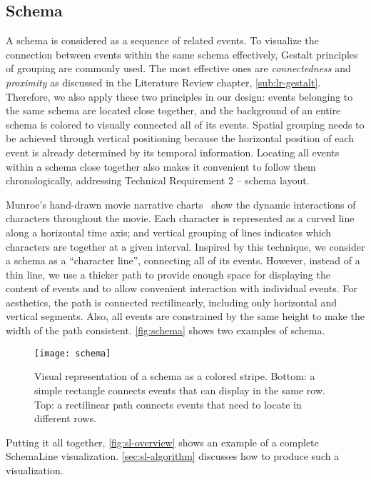 \subsection{Schema}
\label{sub:schema}
A schema is considered as a sequence of related events. To visualize the connection between events within the same schema effectively, Gestalt principles of grouping are commonly used. The most effective ones are \emph{connectedness} and \emph{proximity} as discussed in the Literature Review chapter, \autoref{sub:lr-gestalt}. Therefore, we also apply these two principles in our design: events belonging to the same schema are located close together, and the background of an entire schema is colored to visually connected all of its events. Spatial grouping needs to be achieved through vertical positioning because the horizontal position of each event is already determined by its temporal information. Locating all events within a schema close together also makes it convenient to follow them chronologically, addressing Technical Requirement 2 -- schema layout.

Munroe's hand-drawn movie narrative charts~\cite{Munroe2009} show the dynamic interactions of characters throughout the movie. Each character is represented as a curved line along a horizontal time axis; and vertical grouping of lines indicates which characters are together at a given interval. Inspired by this technique, we consider a schema as a ``character line'', connecting all of its events. However, instead of a thin line, we use a thicker path to provide enough space for displaying the content of events and to allow convenient interaction with individual events. For aesthetics, the path is connected rectilinearly, including only horizontal and vertical segments. Also,  all events are constrained by the same height to make the width of the path consistent. \autoref{fig:schema} shows two examples of schema. 

\begin{figure}[!htb]
	\centering
	\texttt{[image: schema]}
	\caption[Visual representation of a schema]{Visual representation of a schema as a colored stripe. Bottom: a simple rectangle connects events that can display in the same row. Top: a rectilinear path connects events that need to locate in different rows.}
	\label{fig:schema}
\end{figure}

Putting it all together, \autoref{fig:sl-overview} shows an example of a complete SchemaLine visualization. \autoref{sec:sl-algorithm} discusses how to produce such a visualization.

